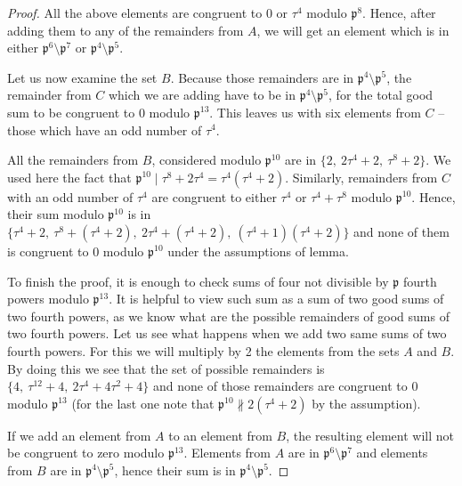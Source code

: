 \documentclass[12pt]{article}
\theoremstyle{remark}
\begin{document}
\begin{proof}
All the above elements are congruent to $0$ or $\tau^4$ modulo $\mathfrak{p}^8$. Hence, after adding them to any of the remainders from $A$, we will get an element which is in either $\mathfrak{p}^6\setminus \mathfrak{p}^7$ or $\mathfrak{p}^4\setminus \mathfrak{p}^5$.


Let us now examine the set $B$. Because those remainders are in $\mathfrak{p}^4 \setminus \mathfrak{p}^5$, the remainder from $C$ which we are adding have to be in $\mathfrak{p}^4\setminus \mathfrak{p}^5$, for the total good sum to be congruent to 0 modulo $\mathfrak{p}^{13}$. This leaves us with six elements from $C$ -- those which have an odd number of $\tau^4$.

All the remainders from $B$, considered modulo $\mathfrak{p}^{10}$ are in $\{2, \ 2\tau^4+2,\ \tau^8+2\}$. We used here the fact that $\mathfrak{p}^{10} \mid \tau^8+2\tau^4 = \tau^4(\tau^4+2)$. Similarly, remainders from $C$ with an odd number of $\tau^4$ are congruent to either $\tau^4$ or $\tau^4+\tau^8$ modulo $\mathfrak{p}^{10}$. Hence, their sum modulo $\mathfrak{p}^{10}$ is in $\{\tau^4+2, \ \tau^8 + (\tau^4+2),\ 2\tau^4+(\tau^4+2),\ (\tau^4+1)(\tau^4+2) \}$ and none of them is congruent to 0 modulo $\mathfrak{p}^{10}$ under the assumptions of lemma. 

To finish the proof, it is enough to check sums of four not divisible by $\mathfrak{p}$ fourth powers modulo $\mathfrak{p}^{13}$. It is helpful to view such sum as a sum of two good sums of two fourth powers, as we know what are the possible remainders of good sums of two fourth powers. Let us see what happens when we add two same sums of two fourth powers. For this we will multiply by 2 the elements from the sets $A$ and $B$. By doing this we see that the set of possible remainders is $\{4, \  \tau^{12}+4,\  2\tau^4+4\tau^2+4\}$ and none of those remainders are congruent to 0 modulo $\mathfrak{p}^{13}$ (for the last one note that $\mathfrak{p}^{10} \not\parallel 2(\tau^4+2)$ by the assumption).

If we add an element from $A$ to an element from $B$, the resulting element will not be congruent to zero modulo  $\mathfrak{p}^{13}$. Elements from $A$ are in $\mathfrak{p}^6\setminus \mathfrak{p}^7$ and elements from $B$ are in $\mathfrak{p}^4\setminus \mathfrak{p}^5$, hence their sum is in $\mathfrak{p}^4\setminus \mathfrak{p}^5$.




\end{proof}
\end{document}
